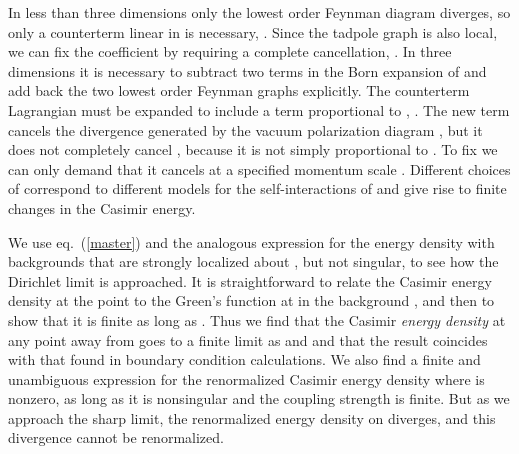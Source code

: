 \documentclass[a4paper,aps,amsfonts,prl,showpacs,nobibnotes,nofootinbib,%
tightenlines,twocolumn]{revtex4}
\providecommand{\vek}[1]{\mathbf{#1}}
\begin{document}
In less than three dimensions only the lowest order Feynman diagram
diverges, so only a counterterm linear in \myHighlight{$\sigma$}\coordHE{} is necessary,
\myHighlight{$\mathcal{L}_{\rm CT} = c_1\lambda\sigma(\vek{x})$}\coordHE{}.  Since the tadpole
graph is also local, we can fix the coefficient \coordHE{} by requiring a
complete cancellation, \coordHE{}.  In three
dimensions it is necessary to subtract two terms in the Born expansion
of \coordHE{} and add back the two lowest order Feynman graphs
explicitly.  The counterterm Lagrangian must be expanded to include a
term proportional to \coordHE{}, \myHighlight{${\cal L}_{\rm CT} =
c_1\lambda\sigma(\vek{x}) + c_2\frac{\lambda^2}{2}\,
\sigma^2(\vek{x})$}\coordHE{}.  The new term cancels the divergence generated by
the vacuum polarization diagram \coordHE{}, but it does not
completely cancel \coordHE{}, because \coordHE{} it is
not simply proportional to \myHighlight{$\int d^{3}x \sigma^{2}(\vek x)$}\coordHE{}.  To fix
\coordHE{} we can only demand that it cancels \coordHE{} at a
specified momentum scale \coordHE{}.  Different choices of \coordHE{}
correspond to different models for the self-interactions of \myHighlight{$\sigma$}\coordHE{}
and give rise to finite changes in the Casimir energy.  

We use eq.~(\ref{master}) and the analogous expression for the energy
density with backgrounds that are strongly localized about \coordHE{},
but not singular, to see how the Dirichlet limit is approached. 
It is straightforward to relate the Casimir energy density at the
point \myHighlight{$\vek x$}\coordHE{} to the Green's function at \myHighlight{$\vek x$}\coordHE{} in the background
\myHighlight{$\sigma$}\coordHE{}, and then to show that it is finite as long as \myHighlight{$\sigma(\vek
x)=0$}\coordHE{}.  Thus we find that the Casimir \emph{energy density} at any
point away from \coordHE{} goes to a finite limit as
\myHighlight{$\sigma\to\delta_{\cal S}(\vek x)$}\coordHE{} and \myHighlight{$\lambda\to\infty$}\coordHE{} and that the
result coincides with that found in boundary condition calculations. 
We also find a finite and unambiguous expression for the renormalized
Casimir energy density where \myHighlight{$\sigma(\vek{x})$}\coordHE{} is nonzero, as long as
it is nonsingular and the coupling strength is finite.  But as we
approach the sharp limit, the renormalized energy density on
\coordHE{} diverges, and this divergence cannot be renormalized.
\end{document}
